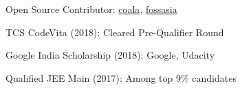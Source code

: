 



\begin{cvhonors}

  \cvhonor
    {Open Source Contributor: } %
    {\href{https://github.com/coala}{coala}, \href{https://github.com/fossasia}{fossasia}} %
    {} %
    {\bullet} %

  \cvhonor
    {TCS CodeVita (2018): } %
    {Cleared Pre-Qualifier Round} %
    {} %
    {\bullet} %

  \cvhonor
    {Google India Scholarship (2018): } %
    {Google, Udacity} %
    {} %
    {\bullet} %
            
  \cvhonor
    {Qualified JEE Main (2017): } %
    {Among top 9\% candidates} %
    {} %
    {\bullet} %

\end{cvhonors}


